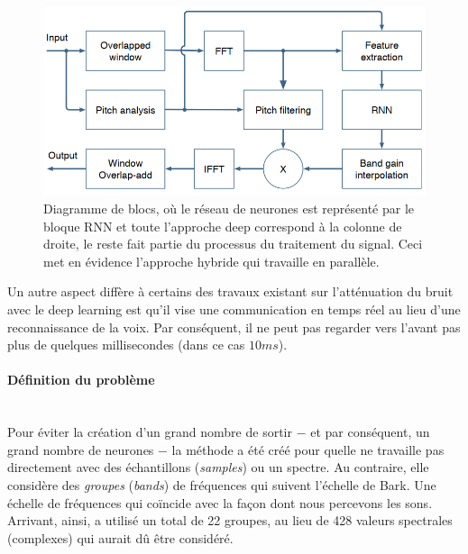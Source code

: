 \documentclass[conference,onecolumn]{IEEEtran}
\begin{document}
 \begin{figure}[H]
 \centering
    \includegraphics[scale=0.7]{Block_Diagram.png}
    \caption{Diagramme de blocs, où le réseau de neurones est représenté par le bloque RNN et toute l’approche deep correspond à la colonne de droite, le reste fait partie du processus du traitement du signal. Ceci met en évidence l’approche hybride qui travaille en parallèle.}
    \label{Figure 16}
\end{figure}

Un autre aspect diffère à certains des travaux existant sur l’atténuation du bruit avec le deep learning est qu’il vise une communication en temps réel au lieu d’une reconnaissance de la voix. Par conséquent, il ne peut pas regarder vers l’avant pas plus de quelques millisecondes (dans ce cas $10 ms$).
\medskip

\paragraph{\textbf{Définition du problème}}
\hfill\\
\hfill
Pour éviter la création d’un grand nombre de sortir $-$ et par conséquent, un grand nombre de neurones $-$ la méthode a été créé pour quelle ne travaille pas directement avec des échantillons (\textit{samples}) ou un spectre. Au contraire, elle considère des \textit{groupes} (\textit{bands}) de fréquences qui suivent l’échelle de Bark. Une échelle de fréquences qui coïncide avec la façon dont nous percevons les sons. Arrivant, ainsi, a utilisé un total de 22 groupes, au lieu de 428 valeurs spectrales (complexes) qui aurait dû être considéré.
\end{document}
